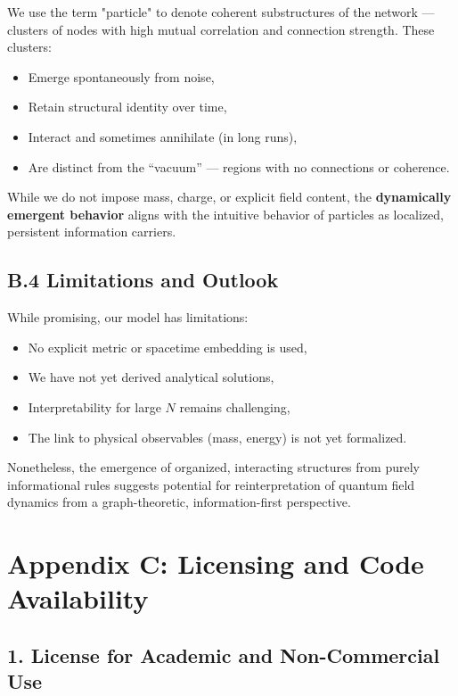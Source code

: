 \documentclass[12pt]{article}
\begin{document}
We use the term "particle" to denote coherent substructures of the network — clusters of nodes with high mutual correlation and connection strength. These clusters:
\begin{itemize}
    \item Emerge spontaneously from noise,
    \item Retain structural identity over time,
    \item Interact and sometimes annihilate (in long runs),
    \item Are distinct from the “vacuum” — regions with no connections or coherence.
\end{itemize}

While we do not impose mass, charge, or explicit field content, the \textbf{dynamically emergent behavior} aligns with the intuitive behavior of particles as localized, persistent information carriers.

\subsection*{B.4 Limitations and Outlook}

While promising, our model has limitations:
\begin{itemize}
    \item No explicit metric or spacetime embedding is used,
    \item We have not yet derived analytical solutions,
    \item Interpretability for large $N$ remains challenging,
    \item The link to physical observables (mass, energy) is not yet formalized.
\end{itemize}

Nonetheless, the emergence of organized, interacting structures from purely informational rules suggests potential for reinterpretation of quantum field dynamics from a graph-theoretic, information-first perspective.

\section*{Appendix C: Licensing and Code Availability}

\subsection*{1. License for Academic and Non-Commercial Use}
\end{document}
